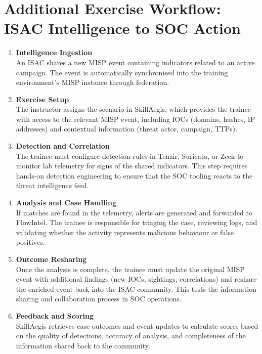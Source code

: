 \documentclass[10pt,a4paper]{report}
\begin{document}
\section{Additional Exercise Workflow: ISAC Intelligence to SOC Action}

\begin{enumerate}
  \item \textbf{Intelligence Ingestion} \\
  An ISAC shares a new MISP event containing indicators related to an active
  campaign. The event is automatically synchronised into the training
  environment’s MISP instance through federation.

  \item \textbf{Exercise Setup} \\
  The instructor assigns the scenario in SkillAegis, which provides the trainee
  with access to the relevant MISP event, including IOCs (domains, hashes, IP
  addresses) and contextual information (threat actor, campaign, TTPs).

  \item \textbf{Detection and Correlation} \\
  The trainee must configure detection rules in Tenzir, Suricata, or Zeek to
  monitor lab telemetry for signs of the shared indicators. This step requires
  hands-on detection engineering to ensure that the SOC tooling reacts to the
  threat intelligence feed.

  \item \textbf{Analysis and Case Handling} \\
  If matches are found in the telemetry, alerts are generated and forwarded to
  FlowIntel. The trainee is responsible for triaging the case, reviewing logs,
  and validating whether the activity represents malicious behaviour or false
  positives.

  \item \textbf{Outcome Resharing} \\
  Once the analysis is complete, the trainee must update the original MISP event
  with additional findings (new IOCs, sightings, correlations) and reshare the
  enriched event back into the ISAC community. This tests the information
  sharing and collaboration process in SOC operations.

  \item \textbf{Feedback and Scoring} \\
  SkillAegis retrieves case outcomes and event updates to calculate scores based
  on the quality of detections, accuracy of analysis, and completeness of the
  information shared back to the community.
\end{enumerate}
\end{document}
